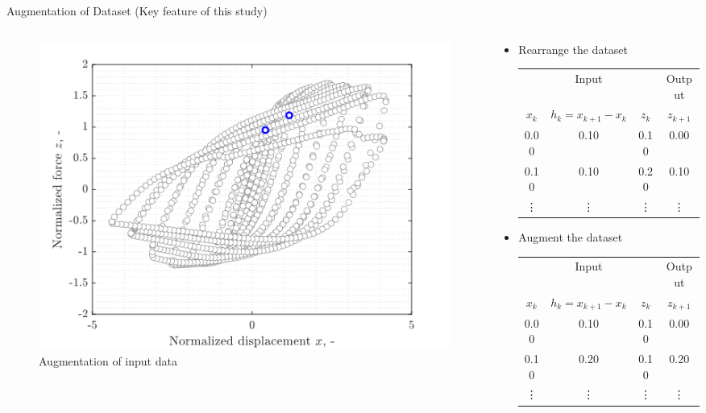 \documentclass[9pt]{beamer}
\newcounter{frame}[frame]
\begin{document}
\begin{frame}{Augmentation of Dataset (Key feature of this study)}
\begin{columns}
\begin{column}{0.4\textwidth}
\begin{figure}
	\includegraphics[height=.45\textheight]{dataSelection02}
	\caption{Augmentation of input data}
\end{figure}
\end{column}
\begin{column}{0.58\textwidth}  %
\begin{itemize}
\item[3.] Rearrange the dataset
	\begin{table}
\small
\begin{tabular}{@{}cccc@{}}
\toprule
\multicolumn{3}{c}{Input} & Output \\ 
$x_k$ & $h_k=x_{k+1}-x_k$ & $z_k$ & $z_{k+1}$\\ \midrule
0.00 & 0.10 & 0.10 & 0.00 \\ 
0.10 & 0.10 & 0.20 & 0.10 \\ 
\vdots & \vdots & \vdots & \vdots \\ 
\bottomrule 
\end{tabular} 	
	\end{table}
\item[4.] Augment the dataset
	\begin{table}
\small
\begin{tabular}{@{}cccc@{}}
\toprule
\multicolumn{3}{c}{Input} & Output \\ 
$x_k$ & $h_k=x_{k+1}-x_k$ & $z_k$ & $z_{k+1}$\\ \midrule
0.00 & 0.10 & 0.10 & 0.00 \\ 
0.10 & 0.20 & 0.10 & 0.20 \\ 
\vdots & \vdots & \vdots & \vdots \\ 
\bottomrule 
\end{tabular} 	
	\end{table}
\end{itemize}
\end{column}
\end{columns}
\end{frame}
\end{document}
